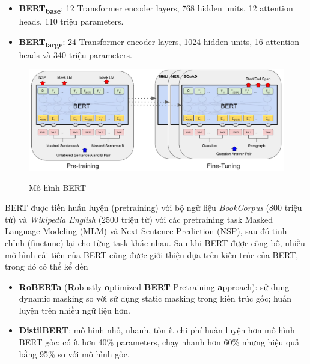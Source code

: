 \begin{itemize}
\item \textbf{BERT\textsubscript{base}}: 12 Transformer encoder layers, 768 hidden units, 12 attention heads, 110 triệu parameters.
\item \textbf{BERT\textsubscript{large}}: 24 Transformer encoder layers, 1024 hidden units, 16 attention heads và 340 triệu parameters.
\end{itemize}
\begin{figure}
\centering
\resizebox{\textwidth}{!}
{\includegraphics{img/BERT.jpg}}
\caption{Mô hình BERT\cite{devlin-etal-2019-bert}}
\label{fig:my_label}
\end{figure}
BERT được tiền huấn luyện (pretraining) với bộ ngữ liệu \textit{BookCorpus} (800 triệu từ) và \textit{Wikipedia English} (2500 triệu từ) với các pretraining task Masked Language Modeling (MLM) và Next Sentence Prediction (NSP), sau đó tinh chỉnh (finetune) lại cho từng task khác nhau. Sau khi BERT được công bố, nhiều mô hình cải tiến của BERT cũng được giới thiệu dựa trên kiến trúc của BERT, trong đó có thể kể đến
\begin{itemize}
\item \textbf{RoBERTa} (\textbf{R}obustly \textbf{o}ptimized \textbf{BERT} Pretraining \textbf{a}pproach)\cite{DBLP:journals/corr/abs-1907-11692}: sử dụng dynamic masking so với sử dụng static masking trong kiến trúc gốc; huấn luyện trên nhiều ngữ liệu hơn.
\item \textbf{DistilBERT}\cite{DBLP:journals/corr/abs-1910-01108}: mô hình nhỏ, nhanh, tốn ít chi phí huấn luyện hơn mô hình BERT gốc: có ít hơn 40\% parameters, chạy nhanh hơn 60\% nhưng hiệu quả bằng 95\% so với mô hình gốc.
\end{itemize}

